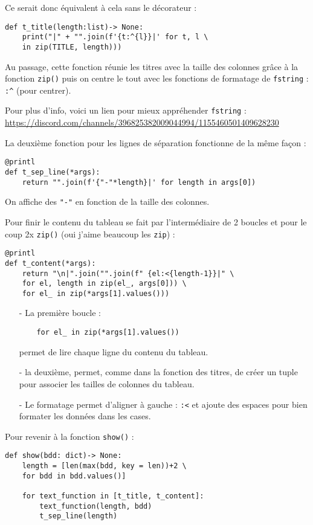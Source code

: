 \documentclass[a4paper,12pt]{article}
\begin{document}
Ce serait donc équivalent à cela sans le décorateur :
\begin{lstlisting}
def t_title(length:list)-> None:
    print("|" + "".join(f'{t:^{l}}|' for t, l \ 
    in zip(TITLE, length)))
\end{lstlisting}
\medskip

Au passage, cette fonction réunie les titres avec la taille des colonnes grâce à la fonction \texttt{zip()} puis on centre le tout avec les fonctions de formatage de \texttt{fstring} :  \og \texttt{:\^}\fg{} (pour centrer).
\medskip

Pour plus d'info, voici un lien pour mieux appréhender \texttt{fstring} :\\
\url{https://discord.com/channels/396825382009044994/1155460501409628230}
\medskip

La deuxième fonction pour les lignes de séparation fonctionne de la même façon :
\begin{lstlisting}
@printl
def t_sep_line(*args):
    return "".join(f'{"-"*length}|' for length in args[0])
\end{lstlisting}
\medskip
On affiche des \texttt{"-"} en fonction de la taille des colonnes.
\medskip

Pour finir le contenu du tableau se fait par l'intermédiaire de 2 boucles et pour le coup 2x \texttt{zip()} (oui j'aime beaucoup les \texttt{zip}) :
\begin{lstlisting}
@printl
def t_content(*args):
    return "\n|".join("".join(f" {el:<{length-1}}|" \ 
    for el, length in zip(el_, args[0])) \ 
    for el_ in zip(*args[1].values()))
\end{lstlisting}
\begin{itemize}
	\item[-] La première boucle :
	\begin{verbatim}
	for el_ in zip(*args[1].values())
	\end{verbatim}
	permet de lire chaque ligne du contenu du tableau.
	\item[-] la deuxième, permet, comme dans la fonction des titres, de créer un tuple pour associer les tailles de colonnes du tableau.
	\item[-] Le formatage permet d'aligner à gauche : \og \texttt{:<}\fg{} et ajoute des espaces pour bien formater les données dans les cases.
\end{itemize}
\medskip

Pour revenir à la fonction \texttt{show()} :
\begin{lstlisting}
def show(bdd: dict)-> None:
    length = [len(max(bdd, key = len))+2 \ 
    for bdd in bdd.values()]

    for text_function in [t_title, t_content]:
        text_function(length, bdd)
        t_sep_line(length)
\end{lstlisting}
\medskip
\end{document}
